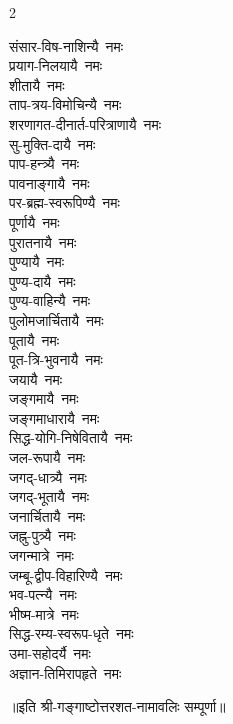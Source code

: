 \begin{multicols}{2}
\begin{flushleft}
संसार-विष-नाशिन्यै~नमः\\
प्रयाग-निलयायै~नमः\\
शीतायै~नमः\\
ताप-त्रय-विमोचिन्यै~नमः\\
शरणागत-दीनार्त-परित्राणायै~नमः\hfill{}\\
सु-मुक्ति-दायै~नमः\\
पाप-हन्त्र्यै~नमः\\
पावनाङ्गायै~नमः\\
पर-ब्रह्म-स्वरूपिण्यै~नमः\\
पूर्णायै~नमः\\
पुरातनायै~नमः\\
पुण्यायै~नमः\\
पुण्य-दायै~नमः\\
पुण्य-वाहिन्यै~नमः\\
पुलोमजार्चितायै~नमः\hfill{}\\
पूतायै~नमः\\
पूत-त्रि-भुवनायै~नमः\\
जयायै~नमः\\
जङ्गमायै~नमः\\
जङ्गमाधारायै~नमः\\
सिद्ध-योगि-निषेवितायै~नमः\\
जल-रूपायै~नमः\\
जगद्-धात्र्यै~नमः\\
जगद्-भूतायै~नमः\\
जनार्चितायै~नमः\hfill{}\\
जह्नु-पुत्र्यै~नमः\\
जगन्मात्रे~नमः\\
जम्बू-द्वीप-विहारिण्यै~नमः\\
भव-पत्न्यै~नमः\\
भीष्म-मात्रे~नमः\\
सिद्ध-रम्य-स्वरूप-धृते~नमः\\
उमा-सहोदर्यै~नमः\\
अज्ञान-तिमिरापहृते~नमः\hfill{}
\end{flushleft}
\end{multicols}

॥इति श्री-गङ्गाष्टोत्तरशत-नामावलिः सम्पूर्णा॥

